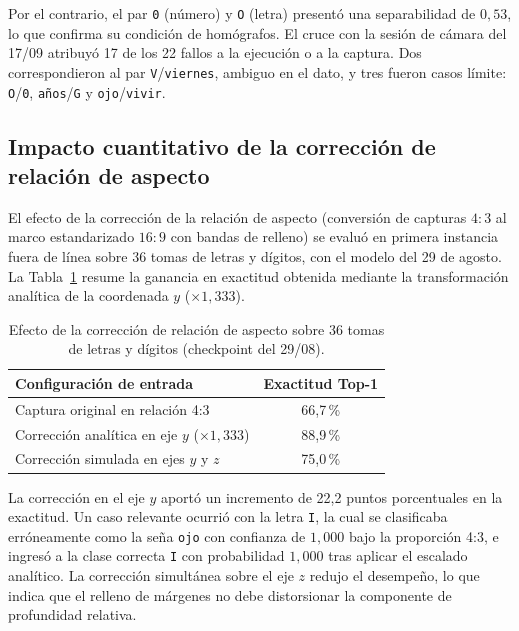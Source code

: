 Por el contrario, el par \texttt{0} (número) y \texttt{O} (letra) presentó una separabilidad de $0{,}53$, lo que confirma su condición de homógrafos. El cruce con la sesión de cámara del 17/09 atribuyó 17 de los 22 fallos a la ejecución o a la captura. Dos correspondieron al par \texttt{V}/\texttt{viernes}, ambiguo en el dato, y tres fueron casos límite: \texttt{O}/\texttt{0}, \texttt{años}/\texttt{G} y \texttt{ojo}/\texttt{vivir}.

\subsection{Impacto cuantitativo de la corrección de relación de aspecto}
El efecto de la corrección de la relación de aspecto (conversión de capturas $4:3$ al marco estandarizado $16:9$ con bandas de relleno) se evaluó en primera instancia fuera de línea sobre 36 tomas de letras y dígitos, con el modelo del 29 de agosto. La Tabla~\ref{tab:aspect} resume la ganancia en exactitud obtenida mediante la transformación analítica de la coordenada $y$ ($\times 1{,}333$).

\begin{table}[H]
    \centering
    \small
    \caption{Efecto de la corrección de relación de aspecto sobre 36 tomas de letras y dígitos (checkpoint del 29/08).}
    \label{tab:aspect}
    \begin{tabular}{lc}
        \toprule
        \textbf{Configuración de entrada} & \textbf{Exactitud Top-1} \\
        \midrule
        Captura original en relación 4:3 & 66{,}7\,\% \\
        Corrección analítica en eje $y$ ($\times 1{,}333$) & 88{,}9\,\% \\
        Corrección simulada en ejes $y$ y $z$ & 75{,}0\,\% \\
        \bottomrule
    \end{tabular}
\end{table}

La corrección en el eje $y$ aportó un incremento de 22,2 puntos porcentuales en la exactitud. Un caso relevante ocurrió con la letra \texttt{I}, la cual se clasificaba erróneamente como la seña \texttt{ojo} con confianza de $1{,}000$ bajo la proporción 4:3, e ingresó a la clase correcta \texttt{I} con probabilidad $1{,}000$ tras aplicar el escalado analítico. La corrección simultánea sobre el eje $z$ redujo el desempeño, lo que indica que el relleno de márgenes no debe distorsionar la componente de profundidad relativa.

